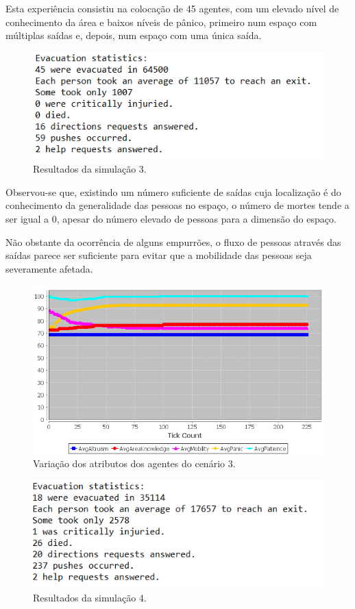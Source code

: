\documentclass[12pt]{article}
\begin{document}
\begin{titlepage}
\begin{itemize}
Esta experiência consistiu na colocação de 45 agentes, com um elevado nível de conhecimento da área e baixos níveis de pânico, primeiro num espaço com múltiplas saídas e, depois, num espaço com uma única saída.

\begin{figure}[H]
	\centering
	\includegraphics{log_sc3.png}
	\caption{Resultados da simulação 3.}
	\label{log_sc3}
\end{figure}

Observou-se que, existindo um número suficiente de saídas cuja localização é do conhecimento da generalidade das pessoas no espaço, o número de mortes tende a ser igual a 0, apesar do número elevado de pessoas para a dimensão do espaço. 

Não obstante da ocorrência de alguns empurrões, o fluxo de pessoas através das saídas parece ser suficiente para evitar que a mobilidade das pessoas seja severamente afetada.

\begin{figure}[H]
	\centering
	\includegraphics{graph_sc3.png}
	\caption{Variação dos atributos dos agentes do cenário 3.}
	\label{graph_sc3}
\end{figure}

\begin{figure}[H]
	\centering
	\includegraphics{log_sc4.png}
	\caption{Resultados da simulação 4.}
	\label{log_sc4}
\end{figure}


\end{itemize}
\end{titlepage}
\end{document}
